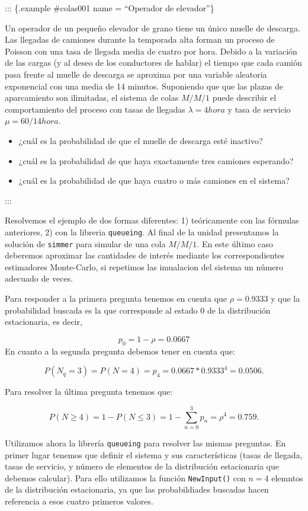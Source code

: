 \documentclass[
]{book}
\providecommand{\tightlist}{%
  \setlength{\itemsep}{0pt}\setlength{\parskip}{0pt}}
\theoremstyle{definition}
\theoremstyle{definition}
\theoremstyle{definition}
\theoremstyle{definition}
\theoremstyle{remark}
\begin{document}
::: \{.example \#colas001 name = ``Operador de elevador''\}

Un operador de un pequeño elevador de grano tiene un único muelle de descarga. Las llegadas de camiones durante la temporada alta forman un proceso de Poisson con una tasa de llegada media de cuatro por hora. Debido a la variación de las cargas (y al deseo de los conductores de hablar) el tiempo que cada camión pasa frente al muelle de descarga se aproxima por una variable aleatoria exponencial con una media de 14 minutos. Suponiendo que que las plazas de aparcamiento son ilimitadas, el sistema de colas \(M/M/1\) puede describir el comportamiento del proceso con tasas de llegadas \(\lambda = 4 hora\) y tasa de servicio \(\mu = 60/14 hora\).

\begin{itemize}
\tightlist
\item
  ¿cuál es la probabilidad de que el muelle de descarga esté inactivo?
\item
  ¿cuál es la probabilidad de que haya exactamente tres camiones esperando?
\item
  ¿cuál es la probabilidad de que haya cuatro o más camiones en el sistema?
\end{itemize}

:::

Resolvemos el ejemplo de dos formas diferentes: 1) teóricamente con las fórmulas anteriores, 2) con la libreria \texttt{queueing}. Al final de la unidad presentamos la solución de \texttt{simmer} para simular de una cola \(M/M/1\). En este último caso deberemos aproximar las cantidades de interés mediante los correspondientes estimadores Monte-Carlo, si repetimos las imualacion del sistema un número adecuado de veces.

Para responder a la primera pregunta tenemos en cuenta que \(\rho = 0.9333\) y que la probabilidad buscada es la que corresponde al estado \(0\) de la distribución estacionaria, es decir,

\[p_0 = 1 - \rho = 0.0667\]
En cuanto a la segunda pregunta debemos tener en cuenta que:

\[P(N_q = 3) = P(N = 4) = p_4 = 0.0667*0.9333^4 = 0.0506.\]

Para resolver la última pregunta tenemos que:

\[P(N \geq 4) = 1 - P(N \leq 3) = 1 - \sum_{n = 0}^{3} p_n = \rho^4 = 0.759.\]

Utilizamos ahora la librería \texttt{queueing} para resolver las mismas preguntas. En primer lugar tenemos que definir el sistema y sus características (tasas de llegada, tasas de servicio, y número de elementos de la distribución estacionaria que debemos calcular). Para ello utilizamos la función \texttt{NewInput()} con \(n = 4\) elemntos de la distribución estacionaria, ya que las probabildiades buscadas hacen referencia a esos cuatro primeros valores.
\end{document}
